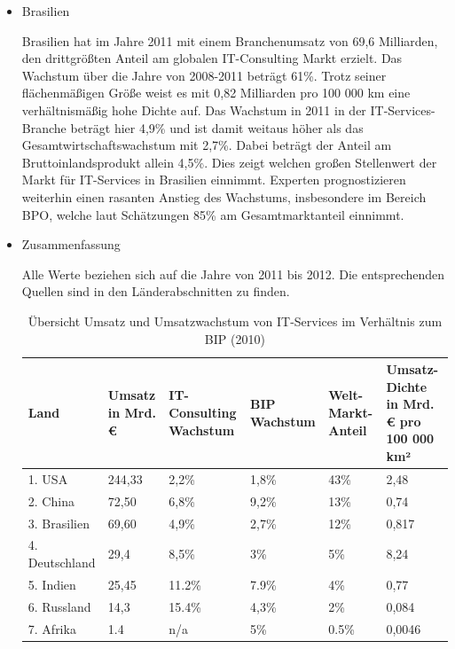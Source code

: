 \begin{itemize}
\item {Brasilien}

Brasilien hat im Jahre 2011 mit einem Branchenumsatz von 69,6 Milliarden, den drittgrößten Anteil am globalen IT-Consulting Markt erzielt. Das Wachstum über die Jahre von 2008-2011 beträgt 61\%. \cite{statBras2} Trotz seiner flächenmäßigen Größe weist es mit 0,82 Milliarden pro 100 000 km eine verhältnismäßig hohe Dichte auf. Das Wachstum in 2011 in der IT-Services-Branche beträgt hier 4,9\% und ist damit weitaus höher als das Gesamtwirtschaftswachstum mit 2,7\%. Dabei beträgt der Anteil am Bruttoinlandsprodukt allein 4,5\%. Dies zeigt welchen großen Stellenwert der Markt für IT-Services in Brasilien einnimmt. Experten prognostizieren weiterhin einen rasanten Anstieg des Wachstums, insbesondere im Bereich BPO, welche laut Schätzungen 85\% am Gesamtmarktanteil einnimmt.\cite{statBras}

\item {Zusammenfassung}

Alle Werte beziehen sich auf die Jahre von 2011 bis 2012. Die entsprechenden Quellen sind in den Länderabschnitten zu finden.


\begin{table}

\caption{Übersicht Umsatz und Umsatzwachstum von IT-Services im Verhältnis zum BIP  (2010)}
\begin{tabular}{|p{2.6cm}|p{1.5cm}|p{2cm}|p{1.5cm}|p{1.5cm}|p{1.7cm}|}
 \hline
  \textbf{Land} & \textbf{Umsatz in Mrd. €} & \textbf{IT-Consulting Wachstum} & \textbf{BIP Wachstum} & \textbf{Welt-Markt-Anteil} & \textbf{Umsatz-Dichte in Mrd. € pro 100 000 km²} \\
  \hline
    
    1. USA  & 244,33  &2,2\%  & 1,8\% & 43\% & 2,48  \\
    2. China & 72,50 & 6,8\%  & 9,2\% & 13\% & 0,74 \\
    3. Brasilien & 69,60 & 4,9\%  & 2,7\% & 12\% & 0,817 \\
    4. Deutschland & 29,4 & 8,5\%  & 3\% & 5\% & 8,24 \\
    5. Indien & 25,45  & 11.2\%  & 7.9\% & 4\% & 0,77  \\
    6. Russland & 14,3  & 15.4\%  & 4,3\% & 2\% & 0,084  \\
    7. Afrika & 1.4  & n/a  & 5\% & 0.5\% & 0,0046 \\
 \hline
\end{tabular}
\label{table:umsaetze} 
\end{table}

\end{itemize}


